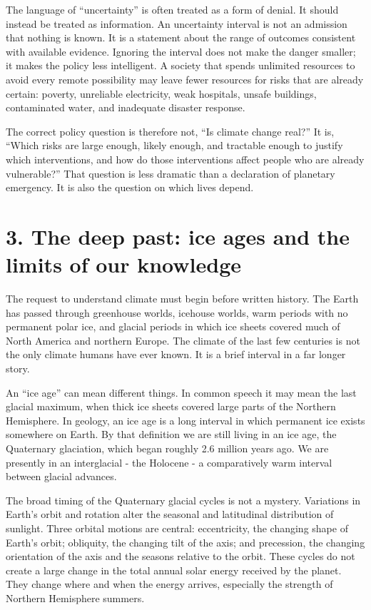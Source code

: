 ﻿\documentclass[12pt,a4paper]{book}
\begin{document}
The language of ``uncertainty'' is often treated as a form of denial. It should instead be treated as information. An uncertainty interval is not an admission that nothing is known. It is a statement about the range of outcomes consistent with available evidence. Ignoring the interval does not make the danger smaller; it makes the policy less intelligent. A society that spends unlimited resources to avoid every remote possibility may leave fewer resources for risks that are already certain: poverty, unreliable electricity, weak hospitals, unsafe buildings, contaminated water, and inadequate disaster response.

The correct policy question is therefore not, ``Is climate change real?'' It is, ``Which risks are large enough, likely enough, and tractable enough to justify which interventions, and how do those interventions affect people who are already vulnerable?'' That question is less dramatic than a declaration of planetary emergency. It is also the question on which lives depend.

\section{3. The deep past: ice ages and the limits of our knowledge}
The request to understand climate must begin before written history. The Earth has passed through greenhouse worlds, icehouse worlds, warm periods with no permanent polar ice, and glacial periods in which ice sheets covered much of North America and northern Europe. The climate of the last few centuries is not the only climate humans have ever known. It is a brief interval in a far longer story.

An ``ice age'' can mean different things. In common speech it may mean the last glacial maximum, when thick ice sheets covered large parts of the Northern Hemisphere. In geology, an ice age is a long interval in which permanent ice exists somewhere on Earth. By that definition we are still living in an ice age, the Quaternary glaciation, which began roughly 2.6 million years ago. We are presently in an interglacial - the Holocene - a comparatively warm interval between glacial advances.

The broad timing of the Quaternary glacial cycles is not a mystery. Variations in Earth's orbit and rotation alter the seasonal and latitudinal distribution of sunlight. Three orbital motions are central: eccentricity, the changing shape of Earth's orbit; obliquity, the changing tilt of the axis; and precession, the changing orientation of the axis and the seasons relative to the orbit. These cycles do not create a large change in the total annual solar energy received by the planet. They change where and when the energy arrives, especially the strength of Northern Hemisphere summers.
\end{document}
